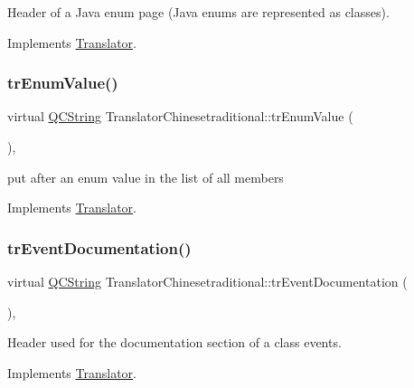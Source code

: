Header of a Java enum page (Java enums are represented as classes). 

Implements \mbox{\hyperlink{class_translator}{Translator}}.

\mbox{\label{class_translator_chinesetraditional_a91000e25a060911c81b829f8fb34c3fb}} 
\subsubsection{\texorpdfstring{trEnumValue()}{trEnumValue()}}
{\footnotesize\ttfamily virtual \mbox{\hyperlink{class_q_c_string}{Q\+C\+String}} Translator\+Chinesetraditional\+::tr\+Enum\+Value (\begin{DoxyParamCaption}{ }\end{DoxyParamCaption})\hspace{0.3cm}{\ttfamily [inline]}, {\ttfamily [virtual]}}

put after an enum value in the list of all members 

Implements \mbox{\hyperlink{class_translator}{Translator}}.

\mbox{\label{class_translator_chinesetraditional_abbe57b2f5a4ce7b21871953016d4217e}} 
\subsubsection{\texorpdfstring{trEventDocumentation()}{trEventDocumentation()}}
{\footnotesize\ttfamily virtual \mbox{\hyperlink{class_q_c_string}{Q\+C\+String}} Translator\+Chinesetraditional\+::tr\+Event\+Documentation (\begin{DoxyParamCaption}{ }\end{DoxyParamCaption})\hspace{0.3cm}{\ttfamily [inline]}, {\ttfamily [virtual]}}

Header used for the documentation section of a class\textquotesingle{} events. 

Implements \mbox{\hyperlink{class_translator}{Translator}}.

